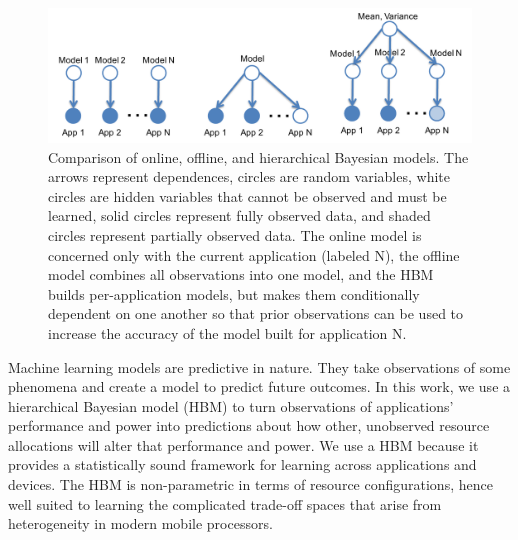 \begin{figure}
   \includegraphics[width=\textwidth]{figures/online_offline_HBM.pdf}
   \caption{ Comparison of online, offline, and hierarchical Bayesian
     models.  The arrows represent dependences, circles are random
     variables, white circles are hidden variables that cannot be
     observed and must be learned, solid circles represent fully
     observed data, and shaded circles represent partially observed
     data.  The online model is concerned only with the current
     application (labeled N), the offline model combines all
     observations into one model, and the HBM builds per-application
     models, but makes them conditionally dependent on one another so
     that prior observations can be used to increase the accuracy of
     the model built for application N.}
\label{fig:learning-models}
\end{figure}


Machine learning models are predictive in nature.  They take
observations of some phenomena and create a model to predict future
outcomes. In this work, we use a hierarchical Bayesian model (HBM) to
turn observations of applications' performance and power into
predictions about how other, unobserved resource allocations will
alter that performance and power.  We use a HBM because it provides a
statistically sound framework for learning across applications and
devices.  The HBM is non-parametric in terms of resource
configurations, hence well suited to learning the complicated
trade-off spaces that arise from heterogeneity in modern mobile
processors.

